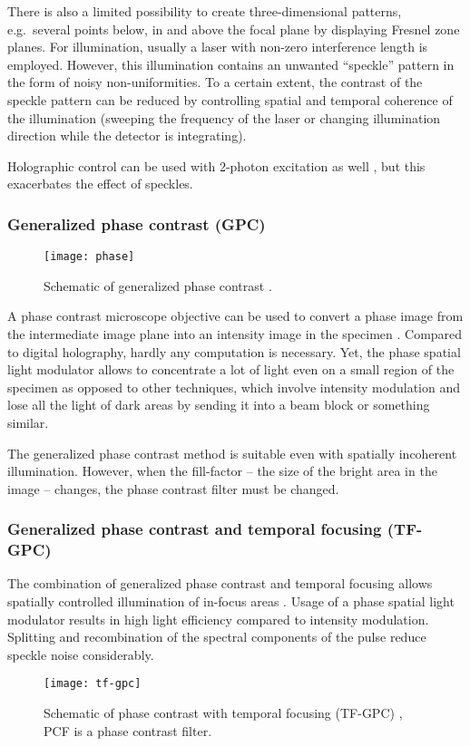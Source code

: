 There is also a limited possibility to create three-dimensional
patterns, e.g.\ several points below, in and above the focal plane by
displaying Fresnel zone planes.  For illumination, usually a laser
with non-zero interference length is employed. However, this
illumination contains an unwanted ``speckle'' pattern in the form of
noisy non-uniformities. To a certain extent, the contrast of the
speckle pattern can be reduced by controlling spatial and temporal
coherence of the illumination (sweeping the frequency of the laser or
changing illumination direction while the detector is integrating).

Holographic control can be used with 2-photon excitation as well
\citep{Nikolenko2008}, %
but this exacerbates the effect of speckles.
\subsubsection{Generalized phase contrast (GPC)}
\begin{figure}[!hbt]
  \centering
  \texttt{[image: phase]} %
  \caption{Schematic of generalized phase contrast
    \citep[from][]{Rodrigo2008}.}
  \label{fig:phase}
\end{figure}
A phase contrast microscope objective  can be used to
convert a phase image from the intermediate image plane into an
intensity image in the specimen \citep{Rodrigo2008}. Compared to digital holography, hardly any computation is
necessary. Yet, the phase spatial light modulator allows to
concentrate a lot of light even on a small region of the specimen as
opposed to other techniques, which involve intensity modulation and
lose all the light of dark areas by sending it into a beam block or
something similar.

The generalized phase contrast method is suitable even with spatially
incoherent illumination. However, when the
fill-factor -- the size of the bright area in the image -- changes,
the phase contrast filter must be changed.
\subsubsection{Generalized phase contrast and temporal focusing (TF-GPC)}
The combination of generalized phase contrast and temporal focusing
allows spatially controlled illumination of in-focus areas
\citep{Papagiakoumou2010}. Usage of a phase spatial light modulator
results in high light efficiency compared to intensity modulation.
Splitting and recombination of the spectral components of the pulse
reduce speckle noise considerably.
\begin{figure}[!hbt]
  \centering
  \texttt{[image: tf-gpc]} 
  \caption{Schematic of phase contrast with temporal focusing (TF-GPC)
    \citep[from][]{Papagiakoumou2010}, PCF is a phase contrast filter.}
  \label{fig:tf-gpc}
\end{figure}

